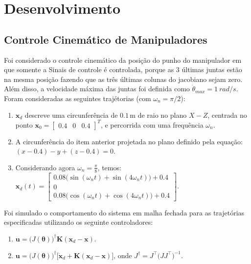 \documentclass[10pt]{article}
\begin{document}
\section{Desenvolvimento}

\subsection{Controle Cinemático de Manipuladores}

Foi considerado o controle cinemático da posição do punho do manipulador
em que somente a Sinais de controle é controlada,
porque as 3 últimas juntas estão na mesma posição fazendo que as três últimas colunas do jacobiano sejam zero.
Além disso, a velocidade máxima das juntas foi definida como $\dot{\theta}_{max} = 1 \ rad/s$. Foram consideradas as seguintes trajétorias (com $\omega_n = \pi/2$):

\begin{enumerate}[label=(\alph*)]
    \item \( \mathbf{x}_d \) descreve uma circunferência de \( 0.1 \, \text{m} \) de raio no plano \( X-Z \), centrada no ponto $\mathbf{x}_0 = \begin{bmatrix} 0.4 & 0 & 0.4 \end{bmatrix}^T$,
    e percorrida com uma frequência \(\omega_n\).

    \item A circunferência do item anterior projetada no plano definido pela equação: $(x - 0.4) - y + (z - 0.4) = 0$.

    \item Considerando agora \(\omega_n = \frac{\pi}{8}\), temos:
    $\mathbf{x}_d(t) = \begin{bmatrix} 0.08 \big(\sin(\omega_n t) + \sin(4\omega_n t)\big) + 0.4 \\ 0 \\ 0.08 \big(\cos(\omega_n t) + \cos(4\omega_n t)\big) + 0.4 \end{bmatrix}.$
\end{enumerate}

Foi simulado o comportamento do sistema em malha fechada para as trajetórias especificadas utilizando os seguinte controladores:

\begin{enumerate}
    \item \( \mathbf{u} = \big(J(\boldsymbol{\theta})\big)^{\dagger} \mathbf{K} (\mathbf{x}_d - \mathbf{x}) \).
    
    \item \( \mathbf{u} = \big(J(\boldsymbol{\theta})\big)^{\dagger} \big[\dot{\mathbf{x}}_d + \mathbf{K} (\mathbf{x}_d - \mathbf{x})\big] \), onde $J^{\dagger} = J^\top \big(J J^\top\big)^{-1}$.
\end{enumerate}
\end{document}
